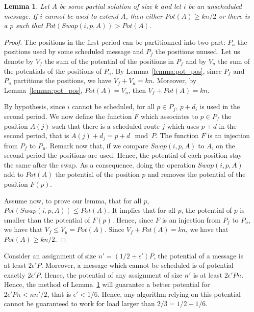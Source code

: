 \documentclass[10pt, conference, letterpaper]{IEEEtran}
\newtheorem{lemma}[theorem]{Lemma}
\begin{document}
\begin{lemma}\label{lemma:swap}
Let $A$ be some partial solution of size $k$ and let $i$ be an unscheduled message. If $i$ cannot be used to extend $A$, then either $Pot(A) \geq kn/2$ or there is a $p$ such that $Pot(Swap(i,p,A)) > Pot(A)$.
\end{lemma}

\begin{proof}
The positions in the first period can be partitionned into two part: $P_{u}$ the positions used by some scheduled message and $P_{f}$ the positions unused.
Let us denote by $V_f$ the sum of the potential of the positions in $P_f$ and by $V_u$ the sum of the potentials of the positions of $P_u$. By Lemma~\ref{lemma:pot_pos}, since $P_f$ and $P_u$ partitions the positions, we have $V_f + V_u = kn$. Moreover, by Lemma~\ref{lemma:pot_pos}, $Pot(A) = V_u$, then $V_f + Pot(A) = kn$.

By hypothesis, since $i$ cannot be scheduled, for all $p \in P_{f}$, $p+d_i$ is used in the second period. We now define the function $F$ which associates to $p \in P_{f}$ the position $A(j)$ such that there is a scheduled route $j$ which uses $p+d$ in the second period, that is $A(j) + d_j = p + d \mod P$. The function $F$ is an injection from $P_{f}$ to $P_u$. Remark now that, if we compare $Swap(i,p,A)$ to $A$, on the second period the positions are used. Hence, the potential of each position stay the same after the swap. As a consequence, doing the operation $Swap(i,p,A)$ add to $Pot(A)$ the potential of the position $p$ and removes the potential of the position $F(p)$. 

Assume now, to prove our lemma, that for all $p$, $Pot(Swap(i,p,A)) \leq Pot(A)$. It implies that for all $p$, the potential of $p$ is smaller than the potential of $F(p)$. Hence,
since $F$ is an injection from $P_f$ to $P_u$, we have that $V_f \leq V_u = Pot(A)$.
Since $V_f + Pot(A) = kn$, we have that $Pot(A) \geq kn/2$.
\end{proof}

Consider an assignment of size $n' = (1/2 + \epsilon')P$, the potential of a message is at least $2\epsilon' P$. 
Moreover, a message which cannot be scheduled is of potential exactly  $2\epsilon' P$. Hence, the potential of 
any assignment of size $n'$ is at least $2\epsilon' P n $. Hence, the method of Lemma~\ref{lemma:swap} will guarantee a better potential for $2\epsilon' P n <  nn'/2$, that is $\epsilon' < 1/6$. Hence, any algorithm relying on this potential
cannot be guaranteed to work for load larger than $2/3 = 1/2 + 1/6$.
\end{document}
